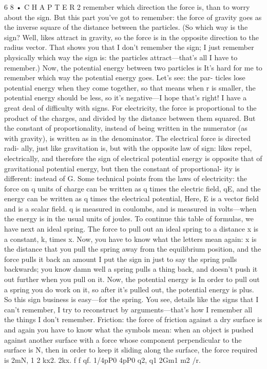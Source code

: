 \documentclass[10pt,oneside]{article}
\begin{document}
6 8 • C H A P T E R  2 remember which direction the force is, than to worry about the sign. But this part you’ve got to remember: the force of gravity goes as the inverse square of the distance between the particles. (So which way is the sign? Well, likes attract in gravity, so the force is in the opposite direction to the radius vector. That shows you that I don’t remember the sign; I just remember physically which way the sign is: the particles attract---that’s all I have to remember.) Now, the potential energy between two particles is It’s hard for me to remember which way the potential energy goes. Let’s see: the par- ticles lose potential energy when they come together, so that means when r is smaller, the potential energy should be less, so it’s negative---I hope that’s right! I have a great deal of difficulty with signs. For electricity, the force is proportional to the product of the charges, and divided by the distance between them squared. But the constant of proportionality, instead of being written in the numerator (as with gravity), is written as in the denominator. The electrical force is directed radi- ally, just like gravitation is, but with the opposite law of sign: likes repel, electrically, and therefore the sign of electrical potential energy is opposite that of gravitational potential energy, but then the constant of proportional- ity is different: instead of G. Some technical points from the laws of electricity: the force on q units of charge can be written as q times the electric field, qE, and the energy can be written as q times the electrical potential, Here, E is a vector field and is a scalar field. q is measured in coulombs, and is measured in volts---when the energy is in the usual units of joules. To continue this table of formulas, we have next an ideal spring. The force to pull out an ideal spring to a distance x is a constant, k, times x. Now, you have to know what the letters mean again: x is the distance that you pull the spring away from the equilibrium position, and the force pulls it back an amount I put the sign in just to say the spring pulls backwards; you know damn well a spring pulls a thing back, and doesn’t push it out further when you pull on it. Now, the potential energy is In order to pull out a spring you do work on it, so after it’s pulled out, the potential energy is plus. So this sign business is easy---for the spring. You see, details like the signs that I can’t remember, I try to reconstruct by arguments---that’s how I remember all the things I don’t remember. Friction: the force of friction against a dry surface is and again you have to know what the symbols mean: when an object is pushed against another surface with a force whose component perpendicular to the surface is N, then in order to keep it sliding along the surface, the force required is 2mN, 1 2 kx2. 2kx. f f qf. 1/4pP0 4pP0 q2, q1 2Gm1 m2 /r.\par
\end{document}
